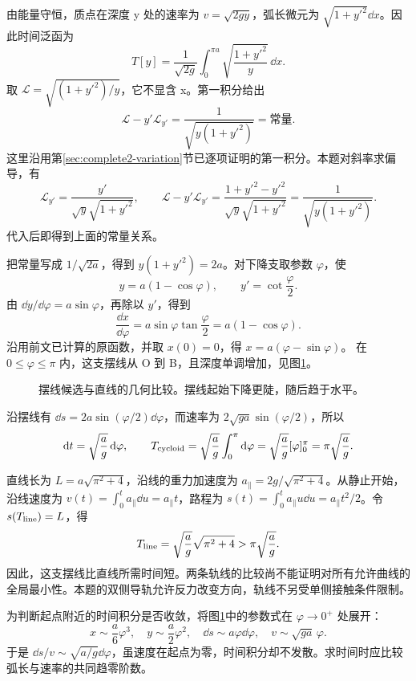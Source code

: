 \begin{solution}
由能量守恒，质点在深度 y 处的速率为 $v=\sqrt{2gy}$，弧长微元为 $\sqrt{1+y'^2}\dd x$。因此时间泛函为
\[
T[y]=\frac1{\sqrt{2g}}\int_0^{\pi a}
\sqrt{\frac{1+y'^2}{y}}\,\dd x.
\]
取 $\mathcal L=\sqrt{(1+y'^2)/y}$，它不显含 x。第一积分给出
\[
\mathcal L-y'\mathcal L_{y'}
=\frac1{\sqrt{y(1+y'^2)}}=\text{常量}.
\]
这里沿用第\ref{sec:complete2-variation}节已逐项证明的第一积分。本题对斜率求偏导，有
\[
\mathcal L_{y'}=\frac{y'}{\sqrt y\sqrt{1+y'^2}},\qquad
\mathcal L-y'\mathcal L_{y'}
=\frac{1+y'^2-y'^2}{\sqrt y\sqrt{1+y'^2}}
=\frac1{\sqrt{y(1+y'^2)}}.
\]
代入后即得到上面的常量关系。

把常量写成 $1/\sqrt{2a}$，得到 $y(1+y'^2)=2a$。对下降支取参数 $\varphi$，使
\[
y=a(1-\cos\varphi),\qquad y'=\cot\frac\varphi2.
\]
由 $\dd y/\dd\varphi=a\sin\varphi$，再除以 $y'$，得到
\[
\frac{\dd x}{\dd\varphi}=a\sin\varphi\tan\frac\varphi2
=a(1-\cos\varphi).
\]
沿用前文已计算的原函数，并取 $x(0)=0$，得 $x=a(\varphi-\sin\varphi)$。
在 $0\le\varphi\le\pi$ 内，这支摆线从 O 到 B，且深度单调增加，见图\ref{sup2:fig:d2-h11-s}。

\begin{figure}[H]\centering
{}
\caption{摆线候选与直线的几何比较。摆线起始下降更陡，随后趋于水平。}\label{sup2:fig:d2-h11-s}
\end{figure}

沿摆线有 $\dd s=2a\sin(\varphi/2)\dd\varphi$，而速率为 $2\sqrt{ga}\sin(\varphi/2)$，所以
\[
\mathop{}\!\mathrm d t=\sqrt{\frac ag}\mathop{}\!\mathrm d\varphi,
\qquad T_{\rm cycloid}=\sqrt{\frac ag}\int_0^\pi\mathop{}\!\mathrm d\varphi
=\sqrt{\frac ag}[\varphi]_0^\pi=\pi\sqrt{\frac ag}.
\]

直线长为 $L=a\sqrt{\pi^2+4}$，沿线的重力加速度为 $a_\parallel=2g/\sqrt{\pi^2+4}$。从静止开始，沿线速度为 $v(t)=\int_0^t a_\parallel\dd u=a_\parallel t$，路程为 $s(t)=\int_0^t a_\parallel u\dd u=a_\parallel t^2/2$。令 $s(T_{\rm line})=L$，得
\[
T_{\rm line}=\sqrt{\frac ag}\sqrt{\pi^2+4}
>\pi\sqrt{\frac ag}.
\]
因此，这支摆线比直线所需时间短。两条轨线的比较尚不能证明对所有允许曲线的全局最小性。本题的双侧导轨允许反力改变方向，轨线不另受单侧接触条件限制。

为判断起点附近的时间积分是否收敛，将图\ref{sup2:fig:d2-h11-s}中的参数式在 $\varphi\to0^+$ 处展开：
\[
x\sim\frac a6\varphi^3,\quad y\sim\frac a2\varphi^2,
\quad\dd s\sim a\varphi\dd\varphi,\quad v\sim\sqrt{ga}\,\varphi.
\]
于是 $\dd s/v\sim\sqrt{a/g}\dd\varphi$，虽速度在起点为零，时间积分却不发散。求时间时应比较弧长与速率的共同趋零阶数。

\end{solution}




